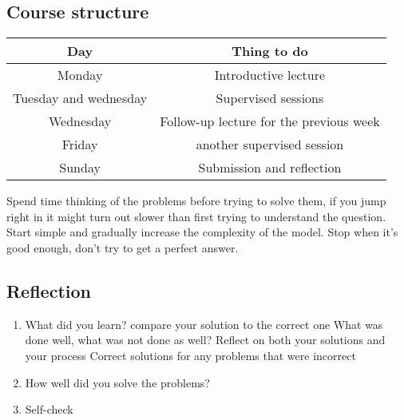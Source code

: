 \subsection{Course structure}
\begin{center}
	\begin{tabular}{| c | c |}
		\hline
		Day                   & Thing to do                             \\
		\hline\hline
		Monday                & Introductive lecture                    \\
		\hline
		Tuesday and wednesday & Supervised sessions                     \\
		\hline
		Wednesday             & Follow-up lecture for the previous week \\
		\hline
		Friday                & another supervised session              \\
		\hline
		Sunday                & Submission and reflection               \\
		\hline
	\end{tabular}
\end{center}
Spend time thinking of the problems before trying to solve them, if you jump right in it might turn out slower than first trying to understand the question.\\
Start simple and gradually increase the complexity of the model. Stop when it's good enough, don't try to get a perfect answer.\\

\subsection{Reflection}
\begin{enumerate}
	\item What did you learn?
	      \subitem compare your solution to the correct one
	      \subitem What was done well, what was not done as well?
	      \subitem Reflect on both your solutions and your process
	      \subitem Correct solutions for any problems that were incorrect
	\item How well did you solve the problems?
	\item Self-check
\end{enumerate}
